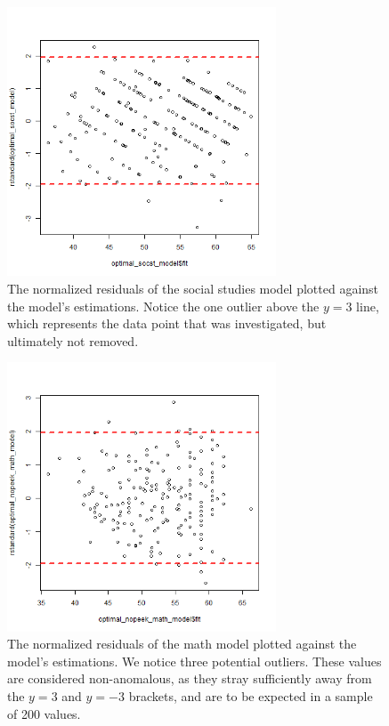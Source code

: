 \documentclass[10pt, a4paper]{article}
\begin{document}
	 \begin{figure}
	 	\includegraphics[width=8cm]{lm_socst_residual_plot.png}
	 	\centering
	 	\caption{The normalized residuals of the social studies model plotted against the model's estimations. Notice the one outlier above the $y=3$ line, which represents the data point that was investigated, but ultimately not removed.}
	 	\label{fig::lm_socst_plot}
	 \end{figure}
 
	 \begin{figure}
	 	\includegraphics[width=8cm]{lm_math_nopeeking_residual_plot.png}
	 	\centering
	 	\caption{The normalized residuals of the math model plotted against the model's estimations. We notice three potential outliers. These values are considered non-anomalous, as they stray sufficiently away from the $y=3$ and $y=-3$ brackets, and are to be expected in a sample of 200 values.}
	 	\label{fig::lm_math_nopeeking_plot}
	 \end{figure}
 
\end{document}
